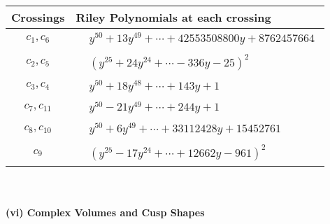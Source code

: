 \documentclass[1p]{elsarticle_modified}
\theoremstyle{definition}
\begin{document}
\begin{tabular}{m{50pt}|m{274pt}}
Crossings & \hspace{64pt}Riley Polynomials at each crossing \\
\hline $$\begin{aligned}c_{1},c_{6}\end{aligned}$$&$\begin{aligned}
&y^{50}+13 y^{49}+\cdots+42553508800 y+8762457664
\end{aligned}$\\
\hline $$\begin{aligned}c_{2},c_{5}\end{aligned}$$&$\begin{aligned}
&(y^{25}+24 y^{24}+\cdots-336 y-25)^{2}
\end{aligned}$\\
\hline $$\begin{aligned}c_{3},c_{4}\end{aligned}$$&$\begin{aligned}
&y^{50}+18 y^{48}+\cdots+143 y+1
\end{aligned}$\\
\hline $$\begin{aligned}c_{7},c_{11}\end{aligned}$$&$\begin{aligned}
&y^{50}-21 y^{49}+\cdots+244 y+1
\end{aligned}$\\
\hline $$\begin{aligned}c_{8},c_{10}\end{aligned}$$&$\begin{aligned}
&y^{50}+6 y^{49}+\cdots+33112428 y+15452761
\end{aligned}$\\
\hline $$\begin{aligned}c_{9}\end{aligned}$$&$\begin{aligned}
&(y^{25}-17 y^{24}+\cdots+12662 y-961)^{2}
\end{aligned}$\\
\hline
\end{tabular}\\~\\
\newpage\flushleft \textbf{(vi) Complex Volumes and Cusp Shapes}
\end{document}
